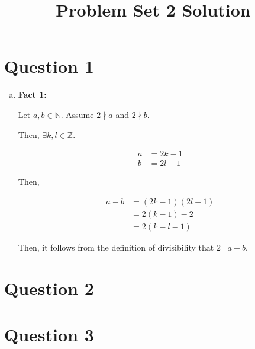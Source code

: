 \documentclass[12pt]{article}
\begin{document}
\title{Problem Set 2 Solution}
\maketitle

\section*{Question 1}
\begin{enumerate}[a.]
    \item

    \textbf{Fact 1:}

    \bigskip

    Let $a,b \in \mathbb{N}$. Assume $2 \nmid a$ and $2 \nmid b$.

    \bigskip

    Then, $\exists k,l \in \mathbb{Z}$.

    \begin{align}
        a &= 2k - 1\\
        b &= 2l - 1
    \end{align}

    \bigskip

    Then,

    \begin{align}
        a - b &= (2k-1)(2l-1)\\
        &= 2(k-1)-2\\
        &= 2(k-l-1)
    \end{align}

    \bigskip

    Then, it follows from the definition of divisibility that $2 \mid a-b$.
\end{enumerate}

\section*{Question 2}

\section*{Question 3}
\end{document}
